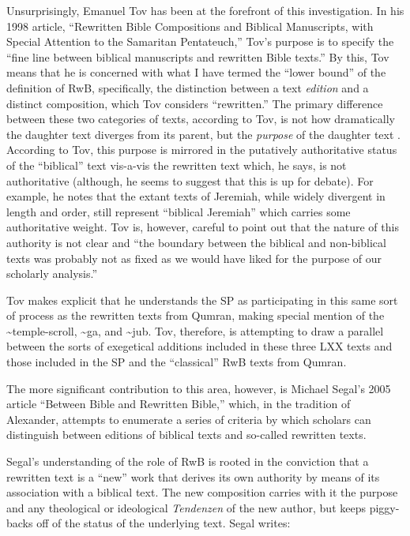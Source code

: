 Unsurprisingly, Emanuel Tov has been at the forefront of this
investigation. In his 1998 article, ``Rewritten Bible Compositions and
Biblical Manuscripts, with Special Attention to the Samaritan
Pentateuch,'' Tov's purpose is to specify the ``fine line between
biblical manuscripts and rewritten Bible
texts.''\autocite[334]{tov_dsd1998} By this, Tov means that he is
concerned with what I have termed the ``lower bound'' of the definition
of RwB, specifically, the distinction between a text \emph{edition} and
a distinct composition, which Tov considers ``rewritten.'' The primary
difference between these two categories of texts, according to Tov, is
not how dramatically the daughter text diverges from its parent, but the
\emph{purpose} of the daughter text \autocite[334]{tov_dsd1998}.
According to Tov, this purpose is mirrored in the putatively
authoritative status of the ``biblical'' text vis-a-vis the rewritten
text which, he says, is not authoritative (although, he seems to suggest
that this is up for debate\autocite[337]{tov_dsd1998}). For example, he
notes that the extant texts of Jeremiah, while widely divergent in
length and order, still represent ``biblical Jeremiah'' which carries
some authoritative weight. Tov is, however, careful to point out that
the nature of this authority is not clear and ``the boundary between the
biblical and non-biblical texts was probably not as fixed as we would
have liked for the purpose of our scholarly
analysis.''\autocite[335]{tov_dsd1998}

Tov makes explicit that he understands the SP as participating in this
same sort of process as the rewritten texts from Qumran, making special
mention of the \textasciitilde{}temple-scroll, \textasciitilde{}ga, and
\textasciitilde{}jub. Tov, therefore, is attempting to draw a parallel
between the sorts of exegetical additions included in these three LXX
texts and those included in the SP and the ``classical'' RwB texts from
Qumran.

The more significant contribution to this area, however, is Michael
Segal's 2005 article ``Between Bible and Rewritten Bible,'' which, in
the tradition of Alexander, attempts to enumerate a series of criteria
by which scholars can distinguish between editions of biblical texts and
so-called rewritten texts.

Segal's understanding of the role of RwB is rooted in the conviction
that a rewritten text is a ``new'' work that derives its own authority
by means of its association with a biblical text. The new composition
carries with it the purpose and any theological or ideological
\emph{Tendenzen} of the new author, but keeps piggy-backs off of the
status of the underlying text.\autocite[11]{segal_henze2005} Segal
writes:

